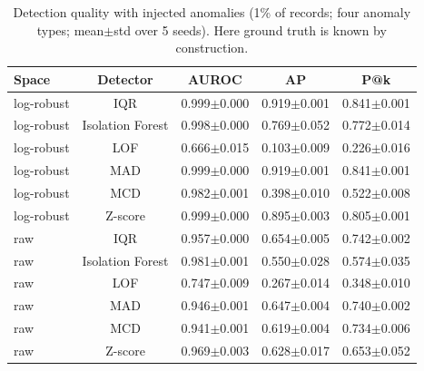 \begin{table}[!t]
\caption{Detection quality with injected anomalies (1\% of records; four anomaly types; mean$\pm$std over 5 seeds). Here ground truth is known by construction.}
\label{tab:ext_injection}
\centering
\setlength{\tabcolsep}{3pt}
\footnotesize
\begin{tabular}{lcccc}
\hline
Space & Detector & AUROC & AP & P@k \\
\hline
log-robust & IQR & 0.999$\pm$0.000 & 0.919$\pm$0.001 & 0.841$\pm$0.001 \\
log-robust & Isolation Forest & 0.998$\pm$0.000 & 0.769$\pm$0.052 & 0.772$\pm$0.014 \\
log-robust & LOF & 0.666$\pm$0.015 & 0.103$\pm$0.009 & 0.226$\pm$0.016 \\
log-robust & MAD & 0.999$\pm$0.000 & 0.919$\pm$0.001 & 0.841$\pm$0.001 \\
log-robust & MCD & 0.982$\pm$0.001 & 0.398$\pm$0.010 & 0.522$\pm$0.008 \\
log-robust & Z-score & 0.999$\pm$0.000 & 0.895$\pm$0.003 & 0.805$\pm$0.001 \\
raw & IQR & 0.957$\pm$0.000 & 0.654$\pm$0.005 & 0.742$\pm$0.002 \\
raw & Isolation Forest & 0.981$\pm$0.001 & 0.550$\pm$0.028 & 0.574$\pm$0.035 \\
raw & LOF & 0.747$\pm$0.009 & 0.267$\pm$0.014 & 0.348$\pm$0.010 \\
raw & MAD & 0.946$\pm$0.001 & 0.647$\pm$0.004 & 0.740$\pm$0.002 \\
raw & MCD & 0.941$\pm$0.001 & 0.619$\pm$0.004 & 0.734$\pm$0.006 \\
raw & Z-score & 0.969$\pm$0.003 & 0.628$\pm$0.017 & 0.653$\pm$0.052 \\
\hline
\end{tabular}
\end{table}